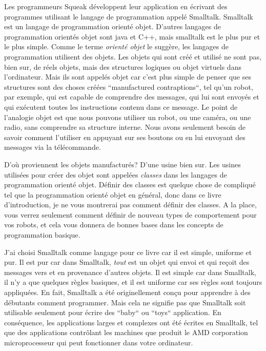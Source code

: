 \documentclass[a4paper,10pt,twoside]{book}
\begin{document}
Les programmeurs Squeak d\'eveloppent leur application en \'ecrivant des programmes utilisant le langage de programmation appel\'e Smalltalk. Smalltalk est un langage de programmation orient\'e objet. D'autres langages de programmation orient\'es objet sont java et C++, mais smalltalk est le plus pur et le plus simple. Comme le terme \emph{orient\'e objet} le sugg\`ere, les langages de programmation utilisent des objets. Les objets qui sont cr\'e\'e et utilis\'e ne sont pas, bien sur, de r\'eels objets, mais des structures logiques ou objet virtuels dans l'ordinateur. Mais ils sont appel\'es objet car c'est plus simple de penser que ses structures sont des choses cr\'e\'ees ``manufactured contraptions``, tel qu'un robot, par exemple, qui est capable de comprendre des messages, qui lui sont envoy\'es et qui ex\'ecutent toutes les instructions contenu dans ce message. Le point de l'analogie objet est que nous pouvons utiliser un robot, ou une cam\'era, ou une radio, sans comprendre sa structure interne. Nous avons seulement besoin de savoir comment l'utiliser en appuyant sur ses boutons ou en lui envoyant des messages via la t\'el\'ecommande.

D'o\`u proviennent les objets manufactur\'es? D'une usine bien sur. Les usines utilis\'ees pour cr\'eer des objet sont appel\'ees \emph{classes} dans les langages de programmation orient\'e objet. D\'efinir des classes est quelque chose de compliqu\'e tel que la programmation orient\'e objet en g\'en\'eral, donc dans ce livre d'introduction, je ne vous montrerai pas comment d\'efinir des classes. A la place, vous verrez seulement comment d\'efinir de nouveau types de comportement pour vos robots, et cela vous donnera de bonnes bases dans les concepts de programmation basique.

J'ai choisi Smalltalk comme langage pour ce livre car il est simple, uniforme et pur. Il est pur car dans Smalltalk, \emph{tout} est un objet qui envoi et qui re\c coit des messages vers et en provenance d'autres objets. Il est simple car dans Smalltalk, il n'y a que quelques r\`egles basiques, et il est uniforme car ses r\`egles sont toujours appliqu\'ees. En fait, Smalltalk a \'et\'e originellement con\c cu pour apprendre \`a des d\'ebutants comment programmer. Mais cela ne signifie pas que Smalltalk soit utilisable seulement pour \'ecrire des ``baby`` ou ``toys`` application. En cons\'equence, les applications larges et complexes ont \'et\'e \'ecrites en Smalltalk, tel que des applications contr\^olant les machines que produit le AMD corporation microprocesseur qui peut fonctionner dans votre ordinateur.
\end{document}
